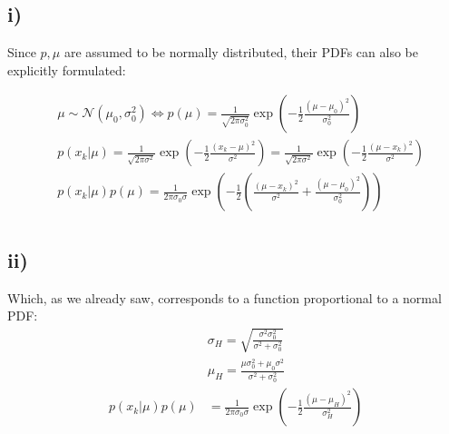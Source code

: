 \documentclass[11pt]{scrartcl} %
\begin{document}
         
         \subsection*{i)}
         Since \(p, \mu\) are assumed to be normally distributed, their PDFs can also be explicitly formulated:

         \begin{equation}\label{eq:2}
           \begin{split}
             &\mu \sim \mathcal{N}(\mu_0, \sigma_0^2) \iff p(\mu) = \frac{1}{\sqrt{2\pi\sigma_0^2}} %
             \exp\left(-\frac{1}{2}\frac{(\mu-\mu_0)^2}{\sigma_0^2} \right)\\
             &p(x_k|\mu) = \frac{1}{\sqrt{2\pi\sigma^2}} \exp\left(-\frac{1}{2}\frac{(x_k-\mu)^2}{\sigma^2} \right)
             = \frac{1}{\sqrt{2\pi\sigma^2}} \exp\left(-\frac{1}{2}\frac{(\mu-x_k)^2}{\sigma^2} \right)\\
             &p(x_k|\mu)p(\mu) = \frac{1}{2\pi\sigma_0\sigma} \exp\left(-\frac{1}{2}\left(\frac{(\mu-x_k)^2}{\sigma^2} +  \frac{(\mu-\mu_0)^2}{\sigma_0^2}\right)\right)\\
           \end{split}
         \end{equation}
         \subsection*{ii)}
         Which, as we already saw, corresponds to a function proportional to a normal PDF:
         \begin{equation}\label{eq:2}
           \begin{split}
             &\sigma_{H} = \sqrt{\frac{\sigma^2\sigma_0^2}{\sigma^2+\sigma_0^2}}\\
             &\mu_{H} = \frac{\mu\sigma_0^2+\mu_0\sigma^2}{\sigma^2+\sigma_0^2}\\
             p(x_k|\mu)p(\mu) &= \frac{1}{2\pi\sigma_0\sigma} \exp\left(-\frac{1}{2}\frac{(\mu-\mu_H)^2}{\sigma_H^2}\right)\\
           \end{split}
         \end{equation}
\end{document}
